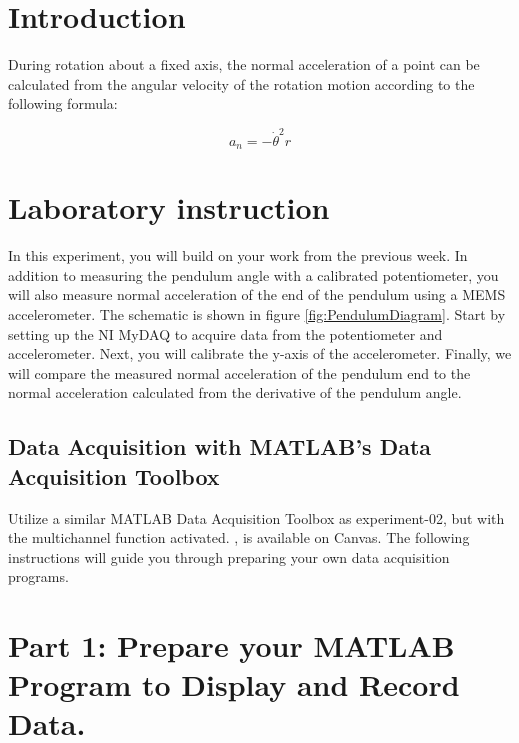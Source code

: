\documentclass{article} %
\begin{document}
\section{Introduction}

During rotation about a fixed axis, the normal acceleration of a point can be calculated from the angular velocity of the rotation motion according to the following formula:

\begin{equation}
a_{n} = -\dot{\theta}^2 r
\label{Eq:NormAcc}
\end{equation}

\section{Laboratory instruction}
In this experiment, you will build on your work from the previous week. In addition to measuring the pendulum angle with a calibrated potentiometer, you will also measure normal acceleration of the end of the pendulum using a MEMS accelerometer. The schematic is shown in figure \ref{fig:PendulumDiagram}. Start by setting up the NI MyDAQ to acquire data from the potentiometer and accelerometer. Next, you will calibrate the y-axis of the accelerometer. Finally, we will compare the measured normal acceleration of the pendulum end to the normal acceleration calculated from the derivative of the pendulum angle.

\subsection{Data Acquisition with MATLAB’s Data Acquisition Toolbox}
Utilize a similar MATLAB Data Acquisition Toolbox as experiment-02, but with the multichannel function activated. , is available on Canvas. The following instructions will guide you through preparing your own data acquisition programs.

\section{Part 1: Prepare your MATLAB Program to Display and Record Data.}
\end{document}

